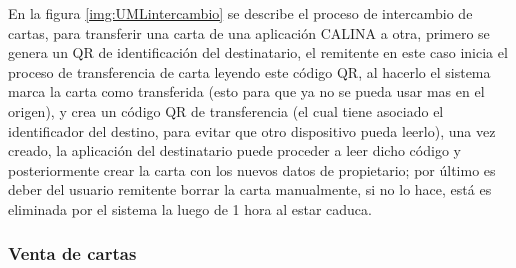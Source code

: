 En la figura \ref{img:UMLintercambio} se describe el proceso de intercambio de cartas, para transferir una 
carta de una aplicación CALINA a otra, primero se genera un QR de identificación del destinatario, el 
remitente en este caso inicia el proceso de transferencia de carta leyendo este código QR, al hacerlo el 
sistema marca la carta como transferida (esto para que ya no se pueda usar mas en el origen), y crea un código 
QR de transferencia (el cual tiene asociado el identificador del destino, para evitar que otro dispositivo 
pueda leerlo), una vez creado, la aplicación del destinatario puede proceder a leer dicho código y 
posteriormente crear la carta con los nuevos datos de propietario; por último es deber del usuario remitente 
borrar la carta manualmente, si no lo hace, está es eliminada por el sistema la luego de 1 hora al estar 
caduca.

\subsubsection{Venta de cartas}

